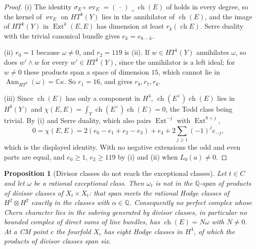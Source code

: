 \documentclass[11pt,reqno]{amsart}
\theoremstyle{plain}
\newtheorem{proposition}[theorem]{Proposition}
\theoremstyle{definition}
\theoremstyle{remark}
\newcommand{\QQ}{\mathbb{Q}}
\newcommand{\CC}{\mathbb{C}}
\DeclareMathOperator{\ch}{ch}
\DeclareMathOperator{\Ext}{Ext}
\DeclareMathOperator{\Ann}{Ann}
\begin{document}
\begin{proof}
(i) The identity $\sigma_{E}\circ\operatorname{ev}_{E}=(\,\cdot\,)\lrcorner
\ch(E)$ of \cite[Setup~2.7]{paperII} holds in every degree, so the kernel of
$\operatorname{ev}_{E}$ on $HT^{k}(Y)$ lies in the annihilator of $\ch(E)$,
and the image of $HT^{k}(Y)$ in $\Ext^{k}(E,E)$ has dimension at least
$r_{k}(\ch E)$. Serre duality with the trivial canonical bundle gives
$e_{k}=e_{8-k}$.

(ii) $r_{0}=1$ because $\omega\ne0$, and $r_{2}=119$ is
(ii). If $w\in HT^{1}(Y)$ annihilates $\omega$, so does
$w'\wedge w$ for every $w'\in HT^{1}(Y)$, since the annihilator is a left
ideal; for $w\ne0$ these products span a space of dimension $15$, which cannot
lie in $\Ann_{HT^{2}}(\omega)=\CC\kappa$. So $r_{1}=16$, and
 gives $r_{8},r_{7},r_{6}$.

(iii) Since $\ch(E)$ has only a component in $H^{4}$, $\ch(E^{\vee})\ch(E)$
lies in $H^{8}(Y)$ and $\chi(E,E)=\int_{Y}\ch(E^{\vee})\ch(E)=0$, the Todd
class being trivial. By (i) and Serre duality, which also pairs
$\Ext^{-j}$ with $\Ext^{8+j}$,
\[
  0=\chi(E,E)=2(e_{0}-e_{1}+e_{2}-e_{3})+e_{4}
  +2\sum_{j\ge1}(-1)^{j}e_{-j},
\]
which is the displayed identity. With no negative extensions the odd and even
parts are equal, and $e_{0}\ge1$, $e_{2}\ge119$ by (i) and (ii) when
$L_{0}(a)\ne0$.
\end{proof}

\begin{proposition}[Divisor classes do not reach the exceptional classes]
\label{prop:mumforddivisor}
Let $t\in C$ and let $\omega$ be a rational exceptional class. Then $\omega_{t}$
is not in the $\QQ$-span of products of divisor classes of $X_{t}\times
X_{t}$: that span meets the rational Hodge classes of $H^{2}\otimes H^{2}$
exactly in the classes with $\alpha\in\QQ$. Consequently no perfect complex
whose Chern character lies in the subring generated by divisor classes, in
particular no bounded complex of direct sums of line bundles, has
$\ch(E)=N\omega$ with $N\ne0$. At a CM point $c$ the fourfold $X_{c}$ has eight
Hodge classes in $H^{4}$, of which the products of divisor classes span six.
\end{proposition}
\end{document}
